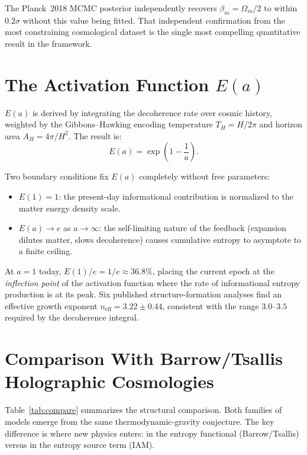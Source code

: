 \documentclass[12pt]{article}
\newcommand{\Oms}{\Omega_m}
\newcommand{\bm}{\beta_m}
\newcommand{\Ea}{E(a)}
\newcommand{\THawk}{T_H}
\newcommand{\AHawk}{A_H}
\begin{document}
The Planck~2018 MCMC posterior independently recovers $\bm = \Oms/2$ to within
$0.2\sigma$ without this value being fitted.  That independent confirmation from
the most constraining cosmological dataset is the single most compelling
quantitative result in the framework.

\section{The Activation Function \texorpdfstring{$E(a)$}{E(a)}}

$\Ea$ is derived by integrating the decoherence rate over cosmic history, weighted
by the Gibbons--Hawking encoding temperature $\THawk = H/2\pi$ and horizon area
$\AHawk = 4\pi/H^2$.  The result is:
\begin{equation}
  E(a) = \exp\!\left(1 - \frac{1}{a}\right).
  \label{eq:Ea}
\end{equation}

Two boundary conditions fix $\Ea$ completely without free parameters:
\begin{itemize}
  \item $E(1) = 1$: the present-day informational contribution is normalized to
        the matter energy density scale.
  \item $E(a) \to e$ as $a\to\infty$: the self-limiting nature of the feedback
        (expansion dilutes matter, slows decoherence) causes cumulative entropy
        to asymptote to a finite ceiling.
\end{itemize}

At $a=1$ today, $E(1)/e = 1/e \approx 36.8\%$, placing the current epoch at the
\emph{inflection point} of the activation function where the rate of informational
entropy production is at its peak.  Six published structure-formation analyses find
an effective growth exponent $n_\mathrm{eff} = 3.22\pm0.44$, consistent with the
range $3.0$--$3.5$ required by the decoherence integral.

\section{Comparison With Barrow/Tsallis Holographic Cosmologies}

Table~\ref{tab:compare} summarizes the structural comparison.  Both families of
models emerge from the same thermodynamic-gravity conjecture.  The key difference
is where new physics enters: in the entropy functional (Barrow/Tsallis) versus in
the entropy source term (IAM).
\end{document}
